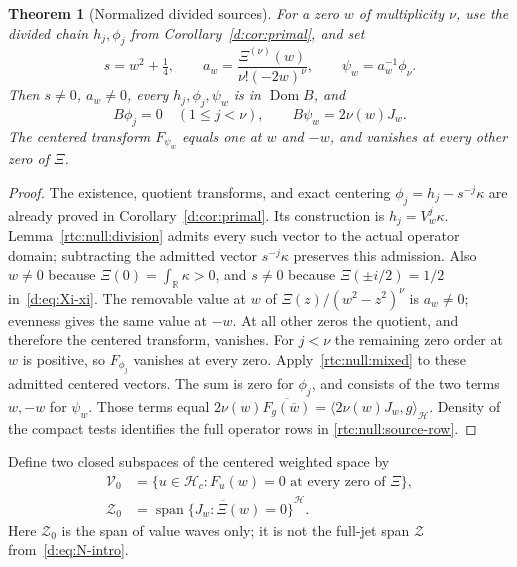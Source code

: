 \documentclass[11pt,a4paper]{article}
\numberwithin{equation}{section}
\newtheorem{theorem}{Theorem}[section]
\theoremstyle{definition}\newtheorem{definition}[theorem]{Definition}
\theoremstyle{remark}\newtheorem{remark}[theorem]{Remark}
\newcommand{\R}{\mathbb R}\newcommand{\C}{\mathbb C}\newcommand{\N}{\mathbb N}
\newcommand{\Hh}{\mathcal H}\newcommand{\Hw}{\mathcal H}
\newcommand{\ip}[2]{\langle#1,#2\rangle}\newcommand{\norm}[1]{\lVert#1\rVert}\newcommand{\abs}[1]{\lvert#1\rvert}
\begin{document}
\begin{theorem}[Normalized divided sources]\label{rtc:null:source}
For a zero $w$ of multiplicity $\nu$, use the divided chain $h_j,\phi_j$
from Corollary~\ref{d:cor:primal}, and set
\begin{equation}\label{rtc:null:normalization}
 s=w^2+\tfrac14,\qquad
 a_w=\frac{\Xi^{(\nu)}(w)}{\nu!(-2w)^\nu},\qquad
 \psi_w=a_w^{-1}\phi_\nu.
\end{equation}
Then $s\ne0$, $a_w\ne0$, every $h_j,\phi_j,\psi_w$ is in
$\operatorname{Dom}B$, and
\begin{equation}\label{rtc:null:source-row}
 B\phi_j=0\quad(1\le j<\nu),\qquad
 B\psi_w=2\nu(w)J_w.
\end{equation}
The centered transform $F_{\psi_w}$ equals one at $w$ and $-w$, and
vanishes at every other zero of $\Xi$.
\end{theorem}
\begin{proof}
The existence, quotient transforms, and exact centering
$\phi_j=h_j-s^{-j}\kappa$ are already proved in
Corollary~\ref{d:cor:primal}.  Its construction is $h_j=V_w^j\kappa$.
Lemma~\ref{rtc:null:division} admits every such vector to the actual
operator domain; subtracting the admitted vector $s^{-j}\kappa$
preserves this admission.  Also $w\ne0$ because $\Xi(0)=\int_\R\kappa>0$, and $s\ne0$ because
$\Xi(\pm i/2)=1/2$ in~\eqref{d:eq:Xi-xi}.  The removable value at $w$ of
$\Xi(z)/(w^2-z^2)^\nu$ is $a_w\ne0$; evenness gives the same value
at $-w$.  At all other zeros the quotient, and therefore the centered
transform, vanishes.  For $j<\nu$ the remaining zero order at $w$ is
positive, so $F_{\phi_j}$ vanishes at every zero.
Apply~\eqref{rtc:null:mixed} to these admitted centered vectors.
The sum is zero for $\phi_j$, and consists of the two terms $w,-w$
for $\psi_w$.  Those terms equal
$2\nu(w)\overline{F_g(\overline w)}=\ip{2\nu(w)J_w}{g}_{\Hh}$.
Density of the compact tests identifies the full operator rows in
\eqref{rtc:null:source-row}.
\end{proof}

Define two closed subspaces of the centered weighted space by
\begin{equation}\label{rtc:null:spaces}
 \begin{split}
 \mathcal V_0&=\{u\in\Hh_c:F_u(w)=0\text{ at every zero of }\Xi\},\\
 \mathcal Z_0&=\overline{\operatorname{span}\{J_w:\Xi(w)=0\}}^{\Hh}.
 \end{split}
\end{equation}
Here $\mathcal Z_0$ is the span of value waves only; it is not the
full-jet span $\mathcal Z$ from~\eqref{d:eq:N-intro}.
\end{document}
